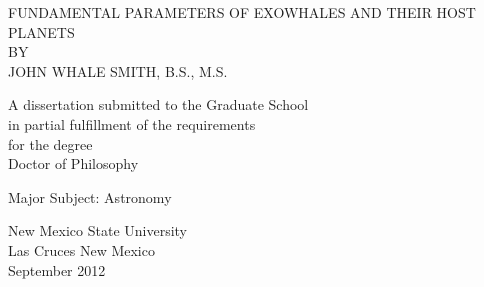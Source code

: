 \begin{center}
FUNDAMENTAL PARAMETERS OF EXOWHALES AND THEIR HOST PLANETS\\
\bigskip
BY\\
\bigskip
JOHN WHALE SMITH, B.S., M.S.
\end{center}
\vspace{1.0in}
\begin{center}
A dissertation submitted to the Graduate School\\
\bigskip
in partial fulfillment of the requirements\\
\bigskip
for the degree\\
\bigskip
Doctor of Philosophy
\end{center}
\bigskip
\begin{center}
Major Subject: Astronomy
\end{center}
\vspace{1.0in}
\begin{center}
New Mexico State University\\
\bigskip
Las Cruces New Mexico\\
\bigskip
September 2012
\end{center}
